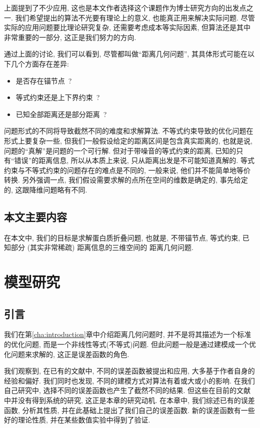 \documentclass{CASthesis_zzk}
\begin{document}
上面提到了不少应用, 这也是本文作者选择这个课题作为博士研究方向的出发点之一.
我们希望提出的算法不光要有理论上的意义, 也能真正用来解决实际问题.
尽管实际的应用问题要比理论研究复杂, 还需要考虑成本等实际因素,
但算法还是其中非常重要的一部分, 这正是我们努力的方向.

通过上面的讨论, 我们可以看到, 
尽管都叫做``距离几何问题'', 其具体形式可能在以下几个方面存在差异:
\begin{itemize}
  \item 是否存在锚节点~?
  \item 等式约束还是上下界约束~?
  \item 已知全部距离还是部分距离~?
\end{itemize}

问题形式的不同将导致截然不同的难度和求解算法.
不等式约束导致的优化问题在形式上要复杂一些, 
但我们一般假设给定的距离区间是包含真实距离的, 也就是说,
问题的``真解''是问题的一个可行解.
但对于带噪音的等式约束的距离, 已知的只有``错误''的距离信息,
所以从本质上来说, 只从距离出发是不可能知道真解的.
等式约束与不等式约束的问题存在的难点是不同的, 
一般来说, 他们并不能简单地等价转换.
另外强调一点, 我们假设需要求解的点所在空间的维数是确定的, 事先给定的,
这跟降维问题略有不同.


 
\section{本文主要内容}

在本文中, 我们的目标是求解蛋白质折叠问题,
也就是, 不带锚节点, 等式约束, 
已知部分 (其实非常稀疏) 距离信息的三维空间的
距离几何问题.

\chapter{模型研究}
\label{cha:models}

\section{引言}
我们在第\ref{cha:introduction}章中介绍距离几何问题时, 
并不是将其描述为一个标准的优化问题, 而是一个非线性等式(不等式)问题.
但此问题一般是通过建模成一个优化问题来求解的, 这正是误差函数的角色.

我们观察到, 在已有的文献中, 不同的误差函数被提出和应用, 
大多基于作者自身的经验和偏好.
我们同时也发现, 不同的建模方式对算法有着或大或小的影响.
在我们自己研究中, 选择不同的误差函数也产生了截然不同的结果.
但这些在目前的文献中并没有得到系统的研究, 这正是本章的研究动机.
在本章中, 我们综述已有的误差函数, 分析其性质, 
并在此基础上提出了我们自己的误差函数.
新的误差函数有一些好的理论性质, 并在某些数值实验中得到了验证.
\end{document}
